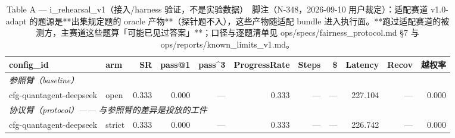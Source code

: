 \begin{table}[t]
\centering
\caption{Table A — i\_rehearsal\_v1（接入/harness 验证，不是实验数据）　脚注（N-348，2026-09-10 用户裁定）：适配赛道 v1.0-adapt 的题源是**出集规定题的 oracle 产物**（探针题不入），这些产物随适配 bundle 进入执行面。**跑过适配赛道的被测方，主赛道这些题算「可能已见过答案」**；口径与逐题清单见 ops/specs/fairness\_protocol.md §7 与 ops/reports/known\_limits\_v1.md。}
\label{tab:a-i_rehearsal_v1}
\begin{tabular}{llrrrrrrrrr}
\toprule
config\_id & arm & SR & pass@1 & pass\^{}3 & ProgressRate & Steps & \$ & Latency & Recov & 越权率 \\
\midrule
\multicolumn{11}{l}{\textit{参照臂（baseline）}} \\
cfg-quantagent-deepseek & open & 0.333 & 0.000 & --- & 0.333 & --- & --- & 227.104 & --- & 0.000 \\
\midrule
\multicolumn{11}{l}{\textit{协议臂（protocol）—— 与参照臂的差异是投放的工件}} \\
cfg-quantagent-deepseek & strict & 0.333 & 0.000 & --- & 0.333 & --- & --- & 226.742 & --- & 0.000 \\
\bottomrule
\end{tabular}
\end{table}


